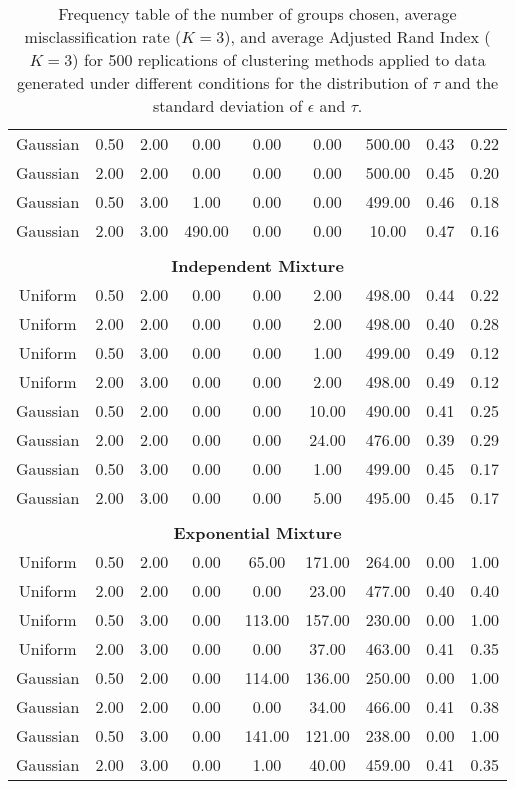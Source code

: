 \documentclass[12pt]{article}
\begin{document}
\begin{table}[ht]
\begin{center}
\begin{tabular}{ccc|cccccc}
  Gaussian & 0.50 & 2.00 & 0.00 & 0.00 & 0.00 & 500.00 & 0.43 & 0.22 \\ 
  Gaussian & 2.00 & 2.00 & 0.00 & 0.00 & 0.00 & 500.00 & 0.45 & 0.20 \\ 
  Gaussian & 0.50 & 3.00 & 1.00 & 0.00 & 0.00 & 499.00 & 0.46 & 0.18 \\ 
  Gaussian & 2.00 & 3.00 & 490.00 & 0.00 & 0.00 & 10.00 & 0.47 & 0.16 \\ 
   \\ \multicolumn{9}{c}{\textbf{Independent Mixture}}\\Uniform & 0.50 & 2.00 & 0.00 & 0.00 & 2.00 & 498.00 & 0.44 & 0.22 \\ 
  Uniform & 2.00 & 2.00 & 0.00 & 0.00 & 2.00 & 498.00 & 0.40 & 0.28 \\ 
  Uniform & 0.50 & 3.00 & 0.00 & 0.00 & 1.00 & 499.00 & 0.49 & 0.12 \\ 
  Uniform & 2.00 & 3.00 & 0.00 & 0.00 & 2.00 & 498.00 & 0.49 & 0.12 \\ 
  Gaussian & 0.50 & 2.00 & 0.00 & 0.00 & 10.00 & 490.00 & 0.41 & 0.25 \\ 
  Gaussian & 2.00 & 2.00 & 0.00 & 0.00 & 24.00 & 476.00 & 0.39 & 0.29 \\ 
  Gaussian & 0.50 & 3.00 & 0.00 & 0.00 & 1.00 & 499.00 & 0.45 & 0.17 \\ 
  Gaussian & 2.00 & 3.00 & 0.00 & 0.00 & 5.00 & 495.00 & 0.45 & 0.17 \\ 
   \\ \multicolumn{9}{c}{\textbf{Exponential Mixture}}\\Uniform & 0.50 & 2.00 & 0.00 & 65.00 & 171.00 & 264.00 & 0.00 & 1.00 \\ 
  Uniform & 2.00 & 2.00 & 0.00 & 0.00 & 23.00 & 477.00 & 0.40 & 0.40 \\ 
  Uniform & 0.50 & 3.00 & 0.00 & 113.00 & 157.00 & 230.00 & 0.00 & 1.00 \\ 
  Uniform & 2.00 & 3.00 & 0.00 & 0.00 & 37.00 & 463.00 & 0.41 & 0.35 \\ 
  Gaussian & 0.50 & 2.00 & 0.00 & 114.00 & 136.00 & 250.00 & 0.00 & 1.00 \\ 
  Gaussian & 2.00 & 2.00 & 0.00 & 0.00 & 34.00 & 466.00 & 0.41 & 0.38 \\ 
  Gaussian & 0.50 & 3.00 & 0.00 & 141.00 & 121.00 & 238.00 & 0.00 & 1.00 \\ 
  Gaussian & 2.00 & 3.00 & 0.00 & 1.00 & 40.00 & 459.00 & 0.41 & 0.35 \\ 
   \hline\end{tabular}
\caption{Frequency table of the number of groups chosen, average misclassification rate ($K=3$), and average Adjusted Rand Index ($K=3$) for 500 replications of clustering methods applied to data generated under different conditions for the distribution of $\tau$ and the standard deviation of $\epsilon$ and $\tau$.}
\label{tab:freq1}
\end{center}
\end{table}
\end{document}
